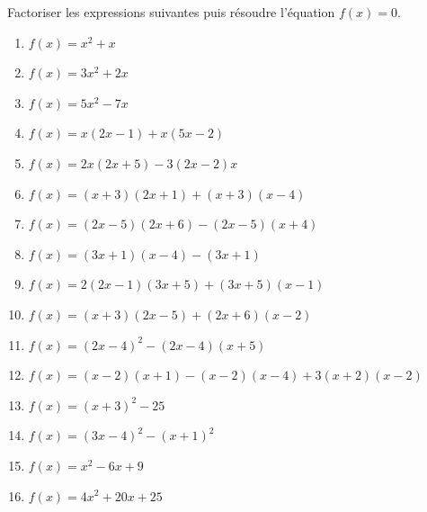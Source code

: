 \documentclass[a4paper,12pt]{article}
\begin{document}
\begin{exercice}[title=Exercice 9]
Factoriser les expressions suivantes puis résoudre l’équation \( f(x) = 0 \).

\begin{enumerate}
    \item \( f(x) = x^2 + x \)
    \item \( f(x) = 3x^2 + 2x \)
    \item \( f(x) = 5x^2 - 7x \)
    \item \( f(x) = x(2x - 1) + x(5x - 2) \)
    \item \( f(x) = 2x(2x + 5) - 3(2x - 2)x \)
    \item \( f(x) = (x + 3)(2x + 1) + (x + 3)(x - 4) \)
    \item \( f(x) = (2x - 5)(2x + 6) - (2x - 5)(x + 4) \)
    \item \( f(x) = (3x + 1)(x - 4) - (3x + 1) \)
    \item \( f(x) = 2(2x - 1)(3x + 5) + (3x + 5)(x - 1) \)
    \item \( f(x) = (x + 3)(2x - 5) + (2x + 6)(x - 2) \)
    \item \( f(x) = (2x - 4)^2 - (2x - 4)(x + 5) \)
    \item \( f(x) = (x - 2)(x + 1) - (x - 2)(x - 4) + 3(x + 2)(x - 2) \)
    \item \( f(x) = (x + 3)^2 - 25 \)
    \item \( f(x) = (3x - 4)^2 - (x + 1)^2 \)
    \item \( f(x) = x^2 - 6x + 9 \)
    \item \( f(x) = 4x^2 + 20x + 25 \)
\end{enumerate}
\end{exercice}
\end{document}

